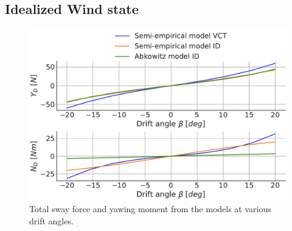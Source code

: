 \subsection{Idealized Wind state}

\label{sec:wind_state}
\begin{figure}[h!]
    \includegraphics[width=\columnwidth]{figures/result_wind_state.forces.pdf}
    \caption{Total sway force and yawing moment from the models at various drift angles.}
    \label{fig:result_wind_state}
\end{figure}